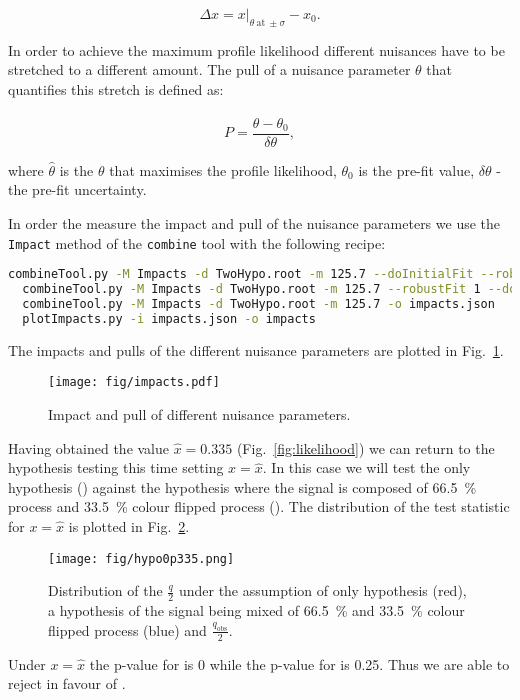 \begin{equation}
  \Delta x = x\bigg\rvert_{\theta\ \text{at}\ \pm\sigma}-x_{0}.
\end{equation} 

In order to achieve the maximum profile likelihood different nuisances have to be stretched to a different amount. The pull of a nuisance parameter $\theta$ that quantifies this stretch is defined as:

\begin{equation}
  P = \frac{\hat{\theta}-\theta_{0}}{\delta\theta},
\end{equation} 

\noindent where $\hat{\theta}$ is the $\theta$ that maximises the profile likelihood, $\theta_{0}$ is the pre-fit value, $\delta\theta$ - the pre-fit uncertainty.

In order the measure the impact and pull of the nuisance parameters we use the \lstinline[language=sh]|Impact| method of the \lstinline[language=sh]|combine| tool with the following recipe:

\begin{lstlisting}[language=sh, breaklines=true]
  combineTool.py -M Impacts -d TwoHypo.root -m 125.7 --doInitialFit --robustFit 1
  combineTool.py -M Impacts -d TwoHypo.root -m 125.7 --robustFit 1 --doFits
  combineTool.py -M Impacts -d TwoHypo.root -m 125.7 -o impacts.json
  plotImpacts.py -i impacts.json -o impacts
\end{lstlisting}

The impacts and pulls of the different nuisance parameters are plotted in Fig.~\ref{fig:impacts}.

\begin{figure}
  \centering
  \texttt{[image: fig/impacts.pdf]}
  \caption{Impact and pull of different nuisance parameters.}
  \label{fig:impacts}
\end{figure}

Having obtained the value $\hat{x}=0.335$ (Fig.~\ref{fig:likelihood}) we can return to the hypothesis testing this time setting $x=\hat{x}$. In this case we will test the \ttbar only hypothesis (\Hnull) against the hypothesis where the signal is composed of 66.5~\% \ttbar process and 33.5~\% colour flipped \ttbar process (\Halt). The distribution of the test statistic for $x=\hat{x}$ is plotted in Fig.~\ref{fig:hypo0p335}.

\begin{figure}
  \centering
  \texttt{[image: fig/hypo0p335.png]}
  \caption{Distribution of the $\frac{q}{2}$ under the assumption of \ttbar only hypothesis (red), a hypothesis of the signal being mixed of 66.5~\% \ttbar and 33.5~\% colour flipped \ttbar process (blue) and $\frac{q_{\text{obs}}}{2}$.}
  \label{fig:hypo0p335}
\end{figure}

Under $x=\hat{x}$ the p-value for \Hnull is 0 while the p-value for \Halt is 0.25. Thus we are able to reject \Hnull in favour of \Halt.
